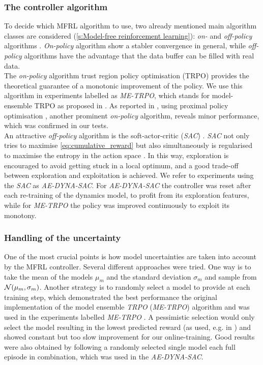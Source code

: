 \documentclass[
reprint,
amsmath,amssymb,amsfonts,clevref,
aps,
prstab,
]{revtex4-2}
\begin{document}
	\subsubsection{The controller algorithm}
	To decide which MFRL algorithm to use, two already mentioned main algorithm classes are considered  (\cref{s:Model-free reinforcement learning}): \emph{on-} and  \emph{off-policy} algorithms \cite{Sutton2018}. \emph{On-policy} algorithm show a stabler convergence in general, while \emph{off-policy} algorithms have the advantage that the data buffer can be filled with real data.\\
	The \emph{on-policy} algorithm trust region policy optimisation (TRPO) \cite{Schulman2015} provides the theoretical guarantee of a monotonic improvement of the policy. We use this algorithm in experiments labelled as \emph{ME-TRPO}, which stands for model-ensemble TRPO as proposed in \cite{Kurutach2018}. As reported in \cite{Kurutach2018}, using proximal policy optimisation \cite{Schulman2017}, another prominent \emph{on-policy} algorithm, reveals minor performance, which was confirmed in our tests. \\
	An attractive \emph{off-policy} algorithm is the soft-actor-critic (\emph{SAC}) \cite{fujimoto2018addressing,Hill2018}. \emph{SAC} not only tries to maximise \cref{eq:cumulative_reward} but also simultaneously is regularised to maximise the entropy in the action space \cite{Haarnoja2018a}. In this way, exploration is encouraged to avoid getting stuck in a local optimum, and a good trade-off between exploration and exploitation is achieved. We refer to experiments using the \emph{SAC} as \emph{AE-DYNA-SAC}. 
	For \emph{AE-DYNA-SAC} the controller was reset after each re-training of the dynamics model, to profit from its exploration features, while for \emph{ME-TRPO} the policy was improved continuously to exploit its monotony.
	\subsubsection{Handling of the uncertainty}
	One of the most crucial points is how model uncertainties are taken into account by the MFRL controller. Several different approaches were tried. One way is to take the mean of the models $\mu_m$ and the standard deviation $\sigma_m$ and sample from $\mathcal{N}(\mu_m,\sigma_m)$. Another strategy is to randomly select a model to provide at each training step, which demonstrated the best performance the original implementation of the model ensemble \emph{TRPO} (\emph{ME-TRPO}) algorithm and was used in the experiments labelled \emph{ME-TRPO} \cite{Kurutach2018}. A pessimistic selection would only select the model resulting in the lowest predicted reward (as used, e.g. in \cite{kidambi2020morel}) and showed constant but too slow improvement for our online-training.
	Good results were also obtained by following a randomly selected single model each full episode in combination, which was used in the \emph{AE-DYNA-SAC}. 
\end{document}
